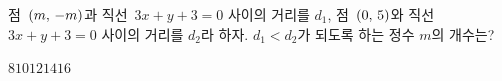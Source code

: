 점~$(m,\mkern3mu -m)$과 직선~$3x+y+3=0$ 사이의 거리를 $d_1$, 점~$(0,\mkern3mu 5)$와 직선~$3x+y+3=0$ 사이의 거리를 $d_2$라 하자. $d_1<d_2$가 되도록 하는 정수 $m$의 개수는?
\begin{choices32}{$8$}{$10$}{$12$}{$14$}{$16$}\end{choices32}
